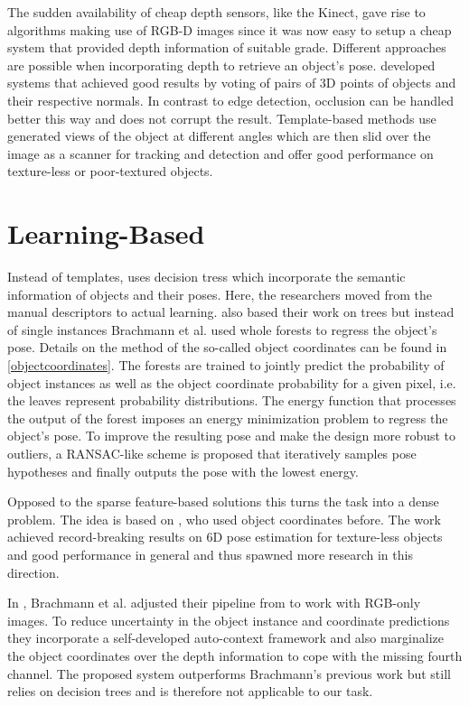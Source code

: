 The sudden availability of cheap depth sensors, like the Kinect, gave rise to algorithms making use of RGB-D images since it was now easy to setup a cheap system that provided depth information of suitable grade. Different approaches are possible when incorporating depth to retrieve an object's pose. \cite{bdrost, salasmoreno} developed systems that achieved good results by voting of pairs of 3D points of objects and their respective normals. In contrast to edge detection, occlusion can be handled better this way and does not corrupt the result. Template-based methods \cite{hinterstoisser1, hinterstoisser2, rioscabrera, csteger} use generated views of the object at different angles which are then slid over the image as a scanner  for tracking and detection and offer good performance on texture-less or poor-textured objects. 

\section{Learning-Based}

Instead of templates, \cite{klai} uses decision tress which incorporate the semantic information of objects and their poses. Here, the researchers moved from the manual descriptors to actual learning. \cite{brachmann1} also based their work on trees but instead of single instances Brachmann et al. used whole forests to regress the object's pose. Details on the method of the so-called object coordinates can be found in \ref{objectcoordinates}. The forests are trained to jointly predict the probability of object instances as well as the object coordinate probability for a given pixel, i.e. the leaves represent probability distributions. The energy function that processes the output of the forest imposes an energy minimization problem to regress the object's pose. To improve the resulting pose and make the design more robust to outliers, a RANSAC-like scheme is proposed that iteratively samples pose hypotheses and finally outputs the pose with the lowest energy.

Opposed to the sparse feature-based solutions this turns the task into a dense problem. The idea is based on \cite{tsharp}, who used object coordinates before. The work achieved record-breaking results on 6D pose estimation for texture-less objects and good performance in general and thus spawned more research in this direction.

In \cite{brachmann2}, Brachmann et al. adjusted their pipeline from \cite{brachmann1} to work with RGB-only images. To reduce uncertainty in the object instance and coordinate predictions they incorporate a self-developed auto-context framework and also marginalize the object coordinates over the depth information to cope with the missing fourth channel. The proposed system outperforms Brachmann's previous work but still relies on decision trees and is therefore not applicable to our task.

